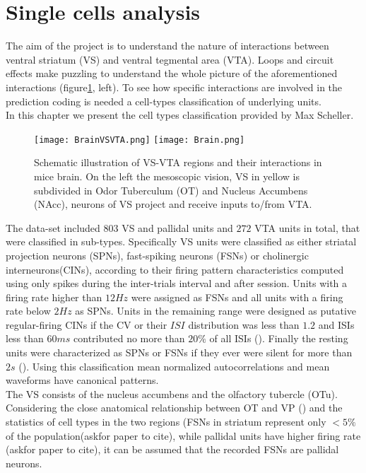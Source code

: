 
\section{Single cells analysis}
\label{chap:UnitsAnalysis}
The aim of the project is to understand the nature of interactions between ventral striatum (VS) and ventral tegmental area (VTA). Loops and circuit effects make puzzling to understand the whole picture of the aforementioned interactions (figure\ref{fig:Brain}, left). To see how specific interactions are involved in the prediction coding is needed a cell-types classification of underlying units.\\
In this chapter we present the cell types classification provided by Max Scheller.
\begin{figure}
    \centering
    \texttt{[image: BrainVSVTA.png]}
    \texttt{[image: Brain.png]}
    \caption{Schematic illustration of VS-VTA regions and their interactions in mice brain. On the left the mesoscopic vision, VS in yellow is subdivided in Odor Tuberculum (OT) and Nucleus Accumbens (NAcc), neurons of VS project and receive inputs to/from VTA.}
    \label{fig:Brain}
\end{figure}
The data-set included $803$ VS and pallidal units and $272$ VTA units in total, that were classified in sub-types. Specifically VS units were classified as either striatal projection neurons (SPNs), fast-spiking neurons (FSNs) or cholinergic interneurons(CINs), according to their firing pattern characteristics computed using only spikes during the inter-trials interval and after session. Units with a firing rate higher than $12 Hz$ were assigned as FSNs and all units with a firing rate below $2 Hz$ as SPNs. Units in the remaining range were designed as putative regular-firing CINs if the CV or their $ISI$ distribution was less than $1.2$ and ISIs less than $60 ms$ contributed no more than $20\%$ of all ISIs (\cite{Inokawa}). Finally the resting units were characterized as SPNs or FSNs if they ever were silent for more than $2 s$ (\cite{Graybiel}). Using this classification mean normalized autocorrelations and mean waveforms have canonical patterns.\\ The VS consists of the nucleus accumbens and the olfactory tubercle (OTu).
Considering the close anatomical relationship between OT and VP (\cite{Heimer1982}) and the statistics of cell types in the two regions (FSNs in striatum represent only $<5\%$ of the population({\color{red}askfor paper to cite}), while pallidal units have higher firing rate ({\color{red}askfor paper to cite}), it can be assumed that the recorded FSNs are pallidal neurons.\\
